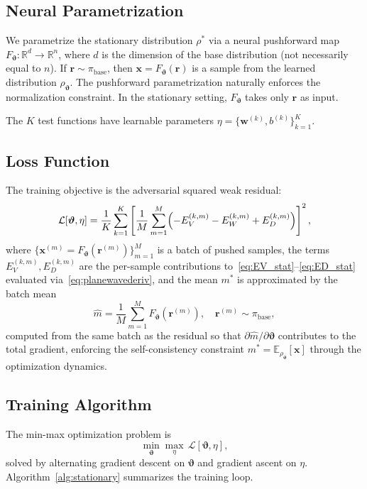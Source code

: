 \documentclass[12pt]{article}
\newcommand{\bx}{\mathbf{x}}
\newcommand{\bw}{\mathbf{w}}
\newcommand{\br}{\mathbf{r}}
\newcommand{\vth}{\boldsymbol{\vartheta}}
\newcommand{\E}{\mathbb{E}}
\newcommand{\Rn}{\mathbb{R}^n}
\newcommand{\Rd}{\mathbb{R}^d}
\newcommand{\hatm}{\hat{m}}
\theoremstyle{plain}
\begin{document}
\subsection{Neural Parametrization}

We parametrize the stationary distribution $\rho^*$ via a neural pushforward map
$F_{\vth}:\Rd\to\Rn$, where $d$ is the dimension of the base distribution (not
necessarily equal to $n$). If $\br\sim\pi_\mathrm{base}$, then $\bx=F_{\vth}(\br)$ is a
sample from the learned distribution $\rho_{\vth}$. The pushforward parametrization
naturally enforces the normalization constraint. In the stationary setting, $F_{\vth}$
takes only $\br$ as input.

The $K$ test functions have learnable parameters $\eta=\{\bw^{(k)},b^{(k)}\}_{k=1}^K$.

\subsection{Loss Function}

The training objective is the adversarial squared weak residual:
\begin{equation}
  \mathcal{L}[\vth,\eta] = \frac{1}{K}\sum_{k=1}^K
  \left[\frac{1}{M}\sum_{m=1}^M
    \Bigl(-E_V^{(k,m)} - E_W^{(k,m)} + E_D^{(k,m)}\Bigr)
  \right]^2,
  \label{eq:loss_stat}
\end{equation}
where $\{\bx^{(m)}=F_{\vth}(\br^{(m)})\}_{m=1}^M$ is a batch of pushed samples,
the terms $E_V^{(k,m)}, E_D^{(k,m)}$ are the per-sample contributions
to~\eqref{eq:EV_stat}--\eqref{eq:ED_stat} evaluated via~\eqref{eq:planewavederiv},
and the mean $m^*$ is approximated by the batch mean
\begin{equation}
  \hatm = \frac{1}{M}\sum_{m=1}^M F_{\vth}(\br^{(m)}),
  \quad \br^{(m)}\sim\pi_\mathrm{base},
  \label{eq:batchmean}
\end{equation}
computed from the same batch as the residual so that $\partial\hatm/\partial\vth$
contributes to the total gradient, enforcing the self-consistency constraint
$m^*=\E_{\rho_{\vth}}[\bx]$ through the optimization dynamics.

\subsection{Training Algorithm}

The min-max optimization problem is
\begin{equation}
  \min_{\vth}\max_{\eta}\,\mathcal{L}[\vth,\eta],
  \label{eq:minmax}
\end{equation}
solved by alternating gradient descent on $\vth$ and gradient ascent on $\eta$.
Algorithm~\ref{alg:stationary} summarizes the training loop.
\end{document}
